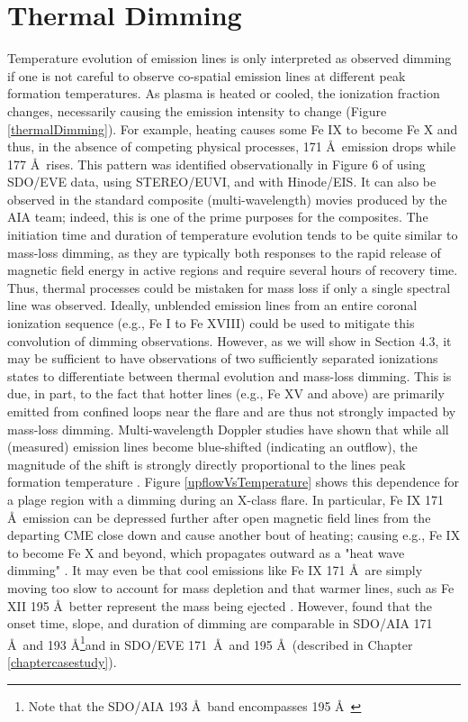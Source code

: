 \section{Thermal Dimming}
Temperature evolution of emission lines is only interpreted as observed dimming if one is not careful to observe co-spatial emission lines at different peak formation temperatures. As plasma is heated or cooled, the ionization fraction changes, necessarily causing the emission intensity to change (Figure \ref{thermalDimming}). For example, heating causes some Fe IX to become Fe X and thus, in the absence of competing physical processes, 171 \AA\ emission drops while 177 \AA\ rises. This pattern was identified observationally in Figure 6 of \citet{Woods2011} using SDO/EVE data, \citet{Robbrecht2010} using STEREO/EUVI, \citet{Jin2009} and \citet{Imada2007} with Hinode/EIS. It can also be observed in the standard composite (multi-wavelength) movies produced by the AIA team; indeed, this is one of the prime purposes for the composites. The initiation time and duration of temperature evolution tends to be quite similar to mass-loss dimming, as they are typically both responses to the rapid release of magnetic field energy in active regions and require several hours of recovery time. Thus, thermal processes could be mistaken for mass loss if only a single spectral line was observed. Ideally, unblended emission lines from an entire coronal ionization sequence (e.g., Fe I to Fe XVIII) could be used to mitigate this convolution of dimming observations. However, as we will show in Section 4.3, it may be sufficient to have observations of two sufficiently separated ionizations states to differentiate between thermal evolution and mass-loss dimming. This is due, in part, to the fact that hotter lines (e.g., Fe XV and above) are primarily emitted from confined loops near the flare and are thus not strongly impacted by mass-loss dimming. Multi-wavelength Doppler studies have shown that while all (measured) emission lines become blue-shifted (indicating an outflow), the magnitude of the shift is strongly directly proportional to the lines peak formation temperature \citep{Imada2007, Jin2009}. Figure \ref{upflowVsTemperature} shows this dependence for a plage region with a dimming during an X-class flare. In particular, Fe IX 171 \AA\ emission can be depressed further after open magnetic field lines from the departing CME close down and cause another bout of heating; causing e.g., Fe IX to become Fe X and beyond, which propagates outward as a "heat wave dimming" \citep{Robbrecht2010}. It may even be that cool emissions like Fe IX 171 \AA\ are simply moving too slow to account for mass depletion and that warmer lines, such as Fe XII 195 \AA\ better represent the mass being ejected \citep{Robbrecht2010}. However, \citet{Mason2014} found that the onset time, slope, and duration of dimming are comparable in SDO/AIA 171 \AA\ and 193 \AA\footnote{Note that the SDO/AIA 193 \AA\ band encompasses 195 \AA\ }and in SDO/EVE 171 \AA\ and 195 \AA\ (described in Chapter \ref{chaptercasestudy}). 

